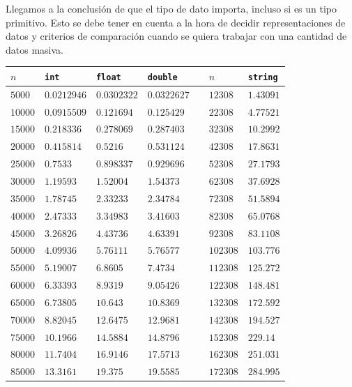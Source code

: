 \documentclass[12pt]{article}
\begin{document}
    Llegamos a la conclusión de que el tipo de dato importa, incluso si es un tipo primitivo. Esto se debe tener en cuenta a la hora de decidir representaciones de datos y criterios de comparación cuando se quiera trabajar con una cantidad de datos masiva.
    \begin{table}
    \centering
        \begin{tabular}{|l|l|l|l||l||l|l|}
            \hline
            $n$ & \verb|int| & \verb|float| & \verb|double| &\qquad\qquad& $n$ & \verb|string| \\
            \hline
            $5000$ & $0.0212946$ & $0.0302322$ & $0.0322627$ & & $12308$ & $1.43091$ \\
            $10000$ & $0.0915509$ & $0.121694$ & $0.125429$ & & $22308$ & $4.77521$ \\
            $15000$ & $0.218336$ & $0.278069$ & $0.287403$ & & $32308$ & $10.2992$ \\
            $20000$ & $0.415814$ & $0.5216$ & $0.531124$ & & $42308$ & $17.8631$ \\
            $25000$ & $0.7533$ & $0.898337$ & $0.929696$ & & $52308$ & $27.1793$ \\
            $30000$ & $1.19593$ & $1.52004$ & $1.54373$ & & $62308$ & $37.6928$ \\
            $35000$ & $1.78745$ & $2.33233$ & $2.34784$ & & $72308$ & $51.5894$ \\
            $40000$ & $2.47333$ & $3.34983$ & $3.41603$ & & $82308$ & $65.0768$ \\
            $45000$ & $3.26826$ & $4.43736$ & $4.63391$ & & $92308$ & $83.1108$ \\
            $50000$ & $4.09936$ & $5.76111$ & $5.76577$ & & $102308$ & $103.776$ \\
            $55000$ & $5.19007$ & $6.8605$ & $7.4734$ & & $112308$ & $125.272$ \\
            $60000$ & $6.33393$ & $8.9319$ & $9.05426$ & & $122308$ & $148.481$ \\
            $65000$ & $6.73805$ & $10.643$ & $10.8369$ & & $132308$ & $172.592$ \\
            $70000$ & $8.82045$ & $12.6475$ & $12.9681$ & & $142308$ & $194.527$ \\
            $75000$ & $10.1966$ & $14.5884$ & $14.8796$ & & $152308$ & $229.14$ \\
            $80000$ & $11.7404$ & $16.9146$ & $17.5713$ & & $162308$ & $251.031$ \\
            $85000$ & $13.3161$ & $19.375$ & $19.5585$ & & $172308$ & $284.995$ \\

\end{tabular}
\end{table}
\end{document}
